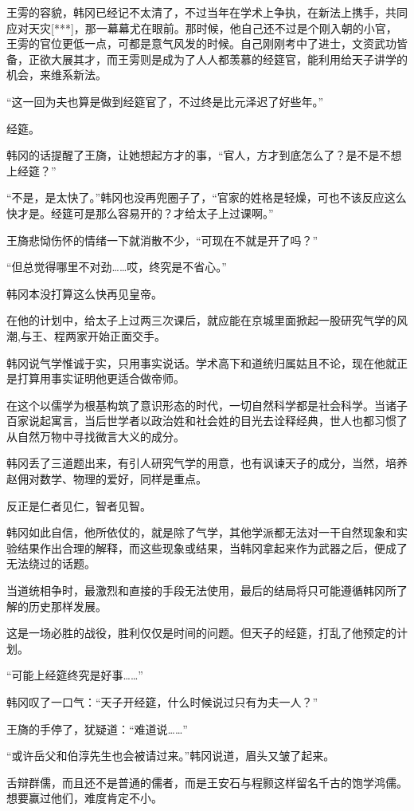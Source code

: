 王雱的容貌，韩冈已经记不太清了，不过当年在学术上争执，在新法上携手，共同应对天灾[***]，那一幕幕尤在眼前。那时候，他自己还不过是个刚入朝的小官，王雱的官位更低一点，可都是意气风发的时候。自己刚刚考中了进士，文资武功皆备，正欲大展其才，而王雱则是成为了人人都羡慕的经筵官，能利用给天子讲学的机会，来维系新法。

“这一回为夫也算是做到经筵官了，不过终是比元泽迟了好些年。”

经筵。

韩冈的话提醒了王旖，让她想起方才的事，“官人，方才到底怎么了？是不是不想上经筵？”

“不是，是太快了。”韩冈也没再兜圈子了，“官家的姓格是轻燥，可也不该反应这么快才是。经筵可是那么容易开的？才给太子上过课啊。”

王旖悲恸伤怀的情绪一下就消散不少，“可现在不就是开了吗？”

“但总觉得哪里不对劲……哎，终究是不省心。”

韩冈本没打算这么快再见皇帝。

在他的计划中，给太子上过两三次课后，就应能在京城里面掀起一股研究气学的风潮,与王、程两家开始正面交手。

韩冈说气学惟诚于实，只用事实说话。学术高下和道统归属姑且不论，现在他就正是打算用事实证明他更适合做帝师。

在这个以儒学为根基构筑了意识形态的时代，一切自然科学都是社会科学。当诸子百家说起寓言，当后世学者以政治姓和社会姓的目光去诠释经典，世人也都习惯了从自然万物中寻找微言大义的成分。

韩冈丢了三道题出来，有引人研究气学的用意，也有讽谏天子的成分，当然，培养赵佣对数学、物理的爱好，同样是重点。

反正是仁者见仁，智者见智。

韩冈如此自信，他所依仗的，就是除了气学，其他学派都无法对一干自然现象和实验结果作出合理的解释，而这些现象或结果，当韩冈拿起来作为武器之后，便成了无法绕过的话题。

当道统相争时，最激烈和直接的手段无法使用，最后的结局将只可能遵循韩冈所了解的历史那样发展。

这是一场必胜的战役，胜利仅仅是时间的问题。但天子的经筵，打乱了他预定的计划。

“可能上经筵终究是好事……”

韩冈叹了一口气：“天子开经筵，什么时候说过只有为夫一人？”

王旖的手停了，犹疑道：“难道说……”

“或许岳父和伯淳先生也会被请过来。”韩冈说道，眉头又皱了起来。

舌辩群儒，而且还不是普通的儒者，而是王安石与程颢这样留名千古的饱学鸿儒。想要赢过他们，难度肯定不小。

